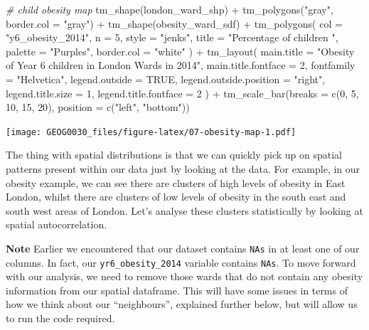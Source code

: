 \documentclass[
]{book}
\newenvironment{Shaded}{\begin{snugshade}}{\end{snugshade}}
\newcommand{\AttributeTok}[1]{\textcolor[rgb]{0.77,0.63,0.00}{#1}}
\newcommand{\CommentTok}[1]{\textcolor[rgb]{0.56,0.35,0.01}{\textit{#1}}}
\newcommand{\ConstantTok}[1]{\textcolor[rgb]{0.00,0.00,0.00}{#1}}
\newcommand{\DecValTok}[1]{\textcolor[rgb]{0.00,0.00,0.81}{#1}}
\newcommand{\FunctionTok}[1]{\textcolor[rgb]{0.00,0.00,0.00}{#1}}
\newcommand{\NormalTok}[1]{#1}
\newcommand{\SpecialCharTok}[1]{\textcolor[rgb]{0.00,0.00,0.00}{#1}}
\newcommand{\StringTok}[1]{\textcolor[rgb]{0.31,0.60,0.02}{#1}}
\begin{document}
\begin{Shaded}
\begin{Highlighting}[]
\CommentTok{\# child obesity map}
\FunctionTok{tm\_shape}\NormalTok{(london\_ward\_shp) }\SpecialCharTok{+}
  \FunctionTok{tm\_polygons}\NormalTok{(}\StringTok{"gray"}\NormalTok{, }\AttributeTok{border.col =} \StringTok{"gray"}\NormalTok{) }\SpecialCharTok{+}
  \FunctionTok{tm\_shape}\NormalTok{(obesity\_ward\_sdf) }\SpecialCharTok{+}
  \FunctionTok{tm\_polygons}\NormalTok{(}
    \AttributeTok{col =} \StringTok{"y6\_obesity\_2014"}\NormalTok{, }\AttributeTok{n =} \DecValTok{5}\NormalTok{, }\AttributeTok{style =} \StringTok{"jenks"}\NormalTok{,}
    \AttributeTok{title =} \StringTok{"Percentage of children "}\NormalTok{, }\AttributeTok{palette =} \StringTok{"Purples"}\NormalTok{,}
    \AttributeTok{border.col =} \StringTok{"white"}
\NormalTok{  ) }\SpecialCharTok{+}
  \FunctionTok{tm\_layout}\NormalTok{(}
    \AttributeTok{main.title =} \StringTok{"Obesity of Year 6 children in London Wards in 2014"}\NormalTok{,}
    \AttributeTok{main.title.fontface =} \DecValTok{2}\NormalTok{, }\AttributeTok{fontfamily =} \StringTok{"Helvetica"}\NormalTok{,}
    \AttributeTok{legend.outside =} \ConstantTok{TRUE}\NormalTok{,}
    \AttributeTok{legend.outside.position =} \StringTok{"right"}\NormalTok{,}
    \AttributeTok{legend.title.size =} \DecValTok{1}\NormalTok{,}
    \AttributeTok{legend.title.fontface =} \DecValTok{2}
\NormalTok{  ) }\SpecialCharTok{+}
  \FunctionTok{tm\_scale\_bar}\NormalTok{(}\AttributeTok{breaks =} \FunctionTok{c}\NormalTok{(}\DecValTok{0}\NormalTok{, }\DecValTok{5}\NormalTok{, }\DecValTok{10}\NormalTok{, }\DecValTok{15}\NormalTok{, }\DecValTok{20}\NormalTok{), }\AttributeTok{position =} \FunctionTok{c}\NormalTok{(}\StringTok{"left"}\NormalTok{, }\StringTok{"bottom"}\NormalTok{))}
\end{Highlighting}
\end{Shaded}

\texttt{[image: GEOG0030\_files/figure-latex/07-obesity-map-1.pdf]}

The thing with spatial distributions is that we can quickly pick up on spatial patterns present within our data just by looking at the data. For example, in our obesity example, we can see there are clusters of high levels of obesity in East London, whilst there are clusters of low levels of obesity in the south east and south west areas of London. Let's analyse these clusters statistically by looking at spatial autocorrelation.

\textbf{Note}
Earlier we encountered that our dataset contains \texttt{NAs} in at least one of our columns. In fact, our \texttt{yr6\_obesity\_2014} variable contains \texttt{NAs}. To move forward with our analysis, we need to remove those wards that do not contain any obesity information from our spatial dataframe. This will have some issues in terms of how we think about our ``neighbours'', explained further below, but will allow us to run the code required.
\end{document}
